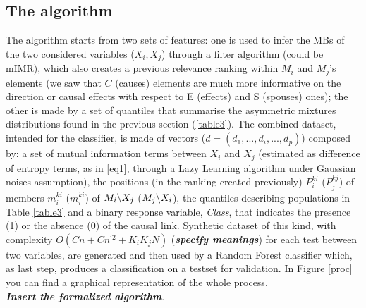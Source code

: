 \subsection{The algorithm}\label{d2c}
The algorithm starts from two sets of features: one is used to infer the MBs of the two considered variables ($X_i, X_j$) through a filter algorithm (could be mIMR), which also creates a previous relevance ranking within $M_i$ and $M_j$'s elements (we saw that $C$ (causes) elements are much more informative on the direction or causal effects with respect to E (effects) and S (spouses) ones); the other is made by a set of quantiles that summarise the asymmetric mixtures distributions found in the previous section (\ref{table3}). The combined dataset, intended for the classifier, is made of vectors ($d = (d_1, ..., d_i, ..., d_p)$) composed by: a set of mutual information terms between $X_i$ and $X_j$ (estimated as difference of entropy terms, as in \ref{eq1}, through a Lazy Learning algorithm under Gaussian noises assumption), the positions (in the ranking created previously) $P^{ki}_i$ ($P^{kj}_j$) of members $m^{ki}_i$ ($m^{ki}_i$) of $M_i \symbol{92} X_j$ ($M_j \symbol{92} X_i$), the quantiles describing populations in Table \ref{table3} and a binary response variable, \textit{Class}, that indicates the presence (1) or the absence (0) of the causal link. Synthetic dataset of this kind, with complexity $O(Cn + Cn^{'2} + K_iK_jN)$ (\textbf{\textit{specify meanings}}) for each test between two variables, are generated and then used by a Random Forest classifier which, as last step, produces a classification on a testset for validation. In Figure \ref{proc} you can find a graphical representation of the whole process.\\

\textbf{\textit{Insert the formalized algorithm}}.